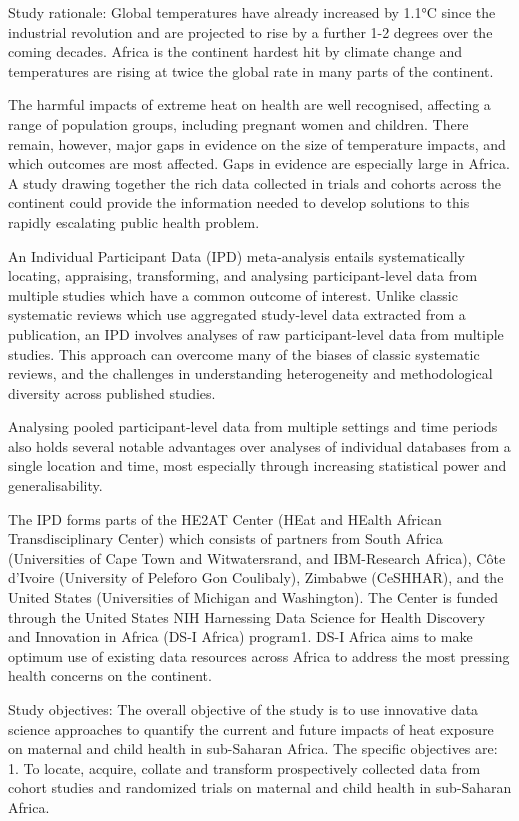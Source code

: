 \documentclass[12pt,letterpaper]{article}
\begin{document}
Study rationale: Global temperatures have already increased by 1.1°C since the industrial revolution and are projected to rise by a further 1-2 degrees over the coming decades. Africa is the continent hardest hit by climate change and temperatures are rising at twice the global rate in many parts of the continent. 

The harmful impacts of extreme heat on health are well recognised, affecting a range of population groups, including pregnant women and children. There remain, however, major gaps in evidence on the size of temperature impacts, and which outcomes are most affected. Gaps in evidence are especially large in Africa. A study drawing together the rich data collected in trials and cohorts across the continent could provide the information needed to develop solutions to this rapidly escalating public health problem.

An Individual Participant Data (IPD) meta-analysis entails systematically locating, appraising, transforming, and analysing participant-level data from multiple studies which have a common outcome of interest. Unlike classic systematic reviews which use aggregated study-level data extracted from a publication, an IPD involves analyses of raw participant-level data from multiple studies. This approach can overcome many of the biases of classic systematic reviews, and the challenges in understanding heterogeneity and methodological diversity across published studies.

Analysing pooled participant-level data from multiple settings and time periods also holds several notable advantages over analyses of individual databases from a single location and time, most especially through increasing statistical power and generalisability.

The IPD forms parts of the HE2AT Center (HEat and HEalth African Transdisciplinary Center) which consists of partners from South Africa (Universities of Cape Town and Witwatersrand, and IBM-Research Africa), Côte d’Ivoire (University of Peleforo Gon Coulibaly), Zimbabwe (CeSHHAR), and the United States (Universities of Michigan and Washington). The Center is funded through the United States NIH Harnessing Data Science for Health Discovery and Innovation in Africa (DS-I Africa) program1. DS-I Africa aims to make optimum use of existing data resources across Africa to address the most pressing health concerns on the continent.

Study objectives: The overall objective of the study is to use innovative data science approaches to quantify the current and future impacts of heat exposure on maternal and child health in sub-Saharan Africa. The specific objectives are: 1.	To locate, acquire, collate and transform prospectively collected data from cohort studies and randomized trials on maternal and child health in sub-Saharan Africa.
\end{document}
